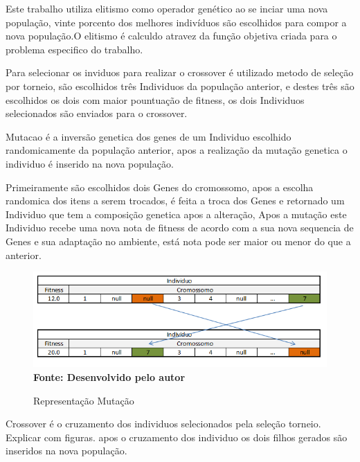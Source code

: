 \documentclass{abntpuc}
\begin{document}

Este trabalho utiliza elitismo como operador genético ao se inciar uma nova população, vinte porcento dos melhores indivíduos são escolhidos para compor a nova população.O elitismo é calculdo atravez da função objetiva criada para o problema especifico do trabalho.\par

Para selecionar os inviduos para realizar o crossover é utilizado metodo de seleção por torneio, são escolhidos três Individuos da população anterior, e destes três são escolhidos os dois com maior pountuação de fitness, os dois Individuos selecionados são enviados para o crossover.\par

Mutacao é a inversão genetica dos genes de um Individuo escolhido randomicamente da população anterior, apos a realização da mutação genetica o individuo é inserido na nova população.\par

Primeiramente são escolhidos dois Genes do cromossomo, apos a escolha randomica dos itens a serem trocados, é feita a troca dos Genes e retornado um Individuo que tem a composição genetica apos a alteração, Apos a mutação este Individuo recebe uma nova nota de fitness de acordo com a sua nova sequencia de Genes e sua adaptação no ambiente, está nota pode ser maior ou menor do que a anterior.\par

\begin{figure}[!htb]
\caption[Representação Mutação]{Representação Mutação}
\label{fig:figura8}
\centering
\includegraphics[scale=0.7]{imagens/representacaoMutacao.png}
\\ \textbf{\footnotesize Fonte: Desenvolvido pelo autor}
\end{figure}

Crossover é o cruzamento dos individuos selecionados pela seleção torneio. Explicar com figuras. apos o cruzamento dos individuo os dois filhos gerados são inseridos na nova população.\par
\end{document}
